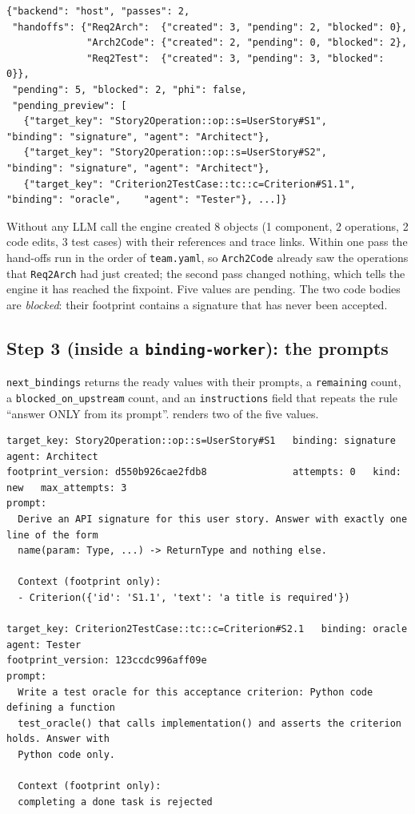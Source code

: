 \documentclass[10pt,a4paper]{article}
\newcommand{\code}[1]{\texttt{#1}}
\newcommand{\file}[1]{\texttt{#1}}
\newcommand{\mcptool}[1]{\texttt{#1}}
\begin{document}
\begin{lstlisting}[style=engine, caption={Observed: the first \code{run} (abridged).}, label={lst:w1run}]
{"backend": "host", "passes": 2,
 "handoffs": {"Req2Arch":  {"created": 3, "pending": 2, "blocked": 0},
              "Arch2Code": {"created": 2, "pending": 0, "blocked": 2},
              "Req2Test":  {"created": 3, "pending": 3, "blocked": 0}},
 "pending": 5, "blocked": 2, "phi": false,
 "pending_preview": [
   {"target_key": "Story2Operation::op::s=UserStory#S1",       "binding": "signature", "agent": "Architect"},
   {"target_key": "Story2Operation::op::s=UserStory#S2",       "binding": "signature", "agent": "Architect"},
   {"target_key": "Criterion2TestCase::tc::c=Criterion#S1.1",  "binding": "oracle",    "agent": "Tester"}, ...]}
\end{lstlisting}

Without any LLM call the engine created 8 objects (1 component, 2
operations, 2 code edits, 3 test cases) with their references and trace
links. Within one pass the hand-offs run in the order of \file{team.yaml},
so \code{Arch2Code} already saw the operations that \code{Req2Arch} had just
created; the second pass changed nothing, which tells the engine it has
reached the fixpoint. Five
values are pending. The two code bodies are \emph{blocked}: their footprint
contains a signature that has never been accepted.

\subsection{Step 3 (inside a \code{binding-worker}): the prompts}

\mcptool{next\_bindings} returns the ready values with their prompts, a
\code{remaining} count, a \code{blocked\_on\_upstream} count, and an
\code{instructions} field that repeats the rule ``answer ONLY from its
prompt''.  renders two of the five values.

\begin{lstlisting}[style=llm, caption={Observed: two of the five values returned by \code{next\_bindings} (rendered).}, label={lst:w1prompts}]
target_key: Story2Operation::op::s=UserStory#S1   binding: signature   agent: Architect
footprint_version: d550b926cae2fdb8               attempts: 0   kind: new   max_attempts: 3
prompt:
  Derive an API signature for this user story. Answer with exactly one line of the form
  name(param: Type, ...) -> ReturnType and nothing else.

  Context (footprint only):
  - Criterion({'id': 'S1.1', 'text': 'a title is required'})

target_key: Criterion2TestCase::tc::c=Criterion#S2.1   binding: oracle   agent: Tester
footprint_version: 123ccdc996aff09e
prompt:
  Write a test oracle for this acceptance criterion: Python code defining a function
  test_oracle() that calls implementation() and asserts the criterion holds. Answer with
  Python code only.

  Context (footprint only):
  completing a done task is rejected
\end{lstlisting}
\end{document}
